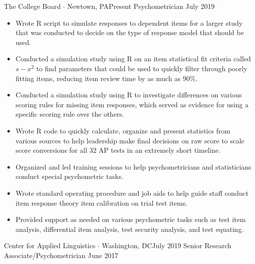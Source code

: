 %
%
%
\begin{experiences}
 \experience
    {The College Board $\cdot$ Newtown, PA}{Present }
    {Psychometrician}
    {July 2019 }    {
       \begin{itemize}
	\item Wrote R script to simulate responses to dependent items for a larger study that was conducted to decide on the type of response model that should be used.    
	\item Conducted a simulation study using R on an item statistical fit criteria called $s-x^2$ to find parameters that could be used to quickly filter through poorly fitting items, reducing item review time by as much as 90\%.  
	\item Conducted a simulation study using R to investigate differences on various scoring rules for missing item responses, which served as evidence for using a specific scoring rule over the others.
	\item Wrote R code to quickly calculate, organize and present statistics from various sources to help leadership make final decisions on raw score to scale score conversions for all 32 AP tests in an extremely short timeline.
	\item Organized and led training sessions to help psychometricians and statisticians conduct special psychometric tasks.   
	\item Wrote standard operating procedure and job aids to help guide staff conduct item response theory item calibration on trial test items. 
	\item Provided support as needed on various psychometric tasks such as test item analysis, differential item analysis, test security analysis, and test equating.
  
       \end{itemize}
                    }

  \emptySeparator  


	\experience
    {Center for Applied Linguistics $\cdot$ Washington, DC}{July 2019}
    {Senior Research Associate/Psychometrician}
    {June 2017} {
      \begin{itemize}


\end{itemize}}
\end{experiences}
